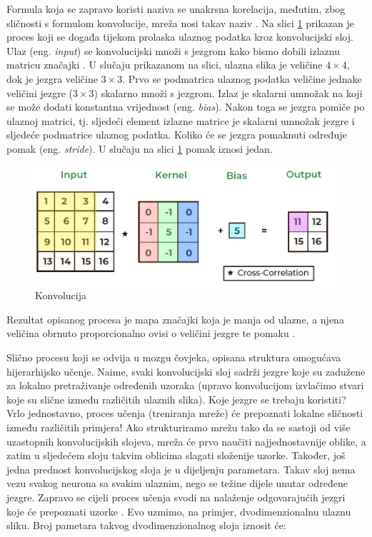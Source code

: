 Formula koja se zapravo koristi naziva se unakrsna korelacija, međutim, zbog sličnosti s 
formulom konvolucije, mreža nosi takav naziv \cite{gracan2020}. Na slici 
\ref{pic:convolution} prikazan je proces koji se događa tijekom prolaska 
ulaznog podatka kroz konvolucijski sloj. Ulaz (eng. \textit{input}) se konvolucijski množi
s jezgrom kako bismo dobili izlaznu matricu značajki \cite{cnn_how}. U slučaju prikazanom na slici,
ulazna slika je veličine \(4 \times 4\), dok je jezgra veličine \(3 \times 3\). Prvo se podmatrica ulaznog
podatka veličine jednake veličini jezgre (\(3 \times 3\)) skalarno množi s jezgrom. Izlaz je 
skalarni umnožak na koji se može dodati konstantna vrijednost (eng. \textit{bias}). Nakon
toga se jezgra pomiče po ulaznoj matrici, tj. sljedeći element izlazne matrice je
skalarni umnožak jezgre i sljedeće podmatrice ulaznog podatka. Koliko će se jezgra
pomaknuti određuje pomak (eng. \textit{stride}). U slučaju na slici \ref{pic:convolution}
pomak iznosi jedan.

\begin{figure}[htb]
      \centering
      \includegraphics[width=0.5\linewidth]{Chapters/neuronska_mreza/CNN/convolution.png} 
      \caption{Konvolucija \cite{convolution}}
      \label{pic:convolution}
\end{figure}

Rezultat opisanog procesa je mapa značajki koja je manja od ulazne, a njena veličina
obrnuto proporcionalno ovisi o veličini jezgre te pomaku \cite{cnn_whatis}. 

Slično procesu koji se odvija u mozgu čovjeka, opisana struktura omogućava hijerarhijsko učenje.
Naime, svaki konvolucijski sloj sadrži jezgre koje su zadužene za lokalno pretraživanje
određenih uzoraka (upravo konvolucijom izvlačimo stvari koje su slične između različitih
ulaznih slika). Koje jezgre se trebaju koristiti? Vrlo jednostavno, proces učenja (treniranja
mreže) će prepoznati lokalne sličnosti između različitih primjera! Ako strukturiramo mrežu
tako da se sastoji od više uzastopnih konvolucijskih slojeva, mreža će prvo naučiti najjednostavnije
oblike, a zatim u sljedećem sloju takvim oblicima slagati složenije uzorke. Također,
još jedna prednost konvolucijskog sloja je u dijeljenju parametara. Takav sloj nema vezu 
svakog neurona sa svakim ulaznim, nego se težine dijele unutar određene jezgre. Zapravo se
cijeli proces učenja svodi na nalaženje odgovarajućih jezgri koje će prepoznati uzorke \cite{pycodemates}.
Evo uzmimo, na primjer, dvodimenzionalnu ulaznu sliku. Broj pametara takvog dvodimenzionalnog
sloja iznosit će:

